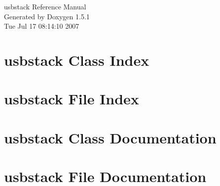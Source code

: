 \documentclass[a4paper]{book}
\begin{document}
\begin{titlepage}
\vspace*{7cm}
\begin{center}
{\Large usbstack Reference Manual}\\
\vspace*{1cm}
{\large Generated by Doxygen 1.5.1}\\
\vspace*{0.5cm}
{\small Tue Jul 17 08:14:10 2007}\\
\end{center}
\end{titlepage}
\clearemptydoublepage
{}
\tableofcontents
\clearemptydoublepage
{}
\chapter{usbstack Class Index}

\chapter{usbstack File Index}

\chapter{usbstack Class Documentation}















\chapter{usbstack File Documentation}



















\printindex
\end{document}
